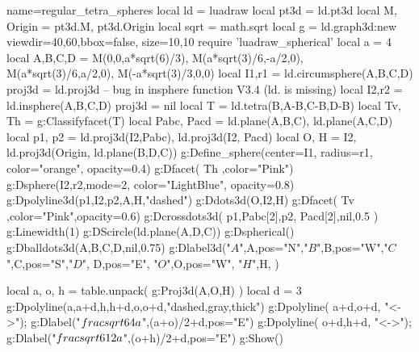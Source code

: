 \documentclass[10pt]{standalone}%
\begin{document}
\begin{luadraw}{name=regular_tetra_spheres}
local ld = luadraw
local pt3d = ld.pt3d
local M, Origin = pt3d.M, pt3d.Origin
local sqrt = math.sqrt
local g = ld.graph3d:new{ viewdir={40,60},bbox=false, size={10,10}}
require 'luadraw_spherical'
local a = 4
local A,B,C,D = M(0,0,a*sqrt(6)/3), M(a*sqrt(3)/6,-a/2,0), M(a*sqrt(3)/6,a/2,0), M(-a*sqrt(3)/3,0,0)
local I1,r1 = ld.circumsphere(A,B,C,D)
proj3d = ld.proj3d -- bug in insphere function V3.4 (ld. is missing)
local I2,r2 = ld.insphere(A,B,C,D)
proj3d = nil
local T = ld.tetra(B,A-B,C-B,D-B)
local Tv, Th = g:Classifyfacet(T)
local Pabc, Pacd = ld.plane(A,B,C), ld.plane(A,C,D)
local p1, p2 = ld.proj3d(I2,Pabc), ld.proj3d(I2, Pacd)
local O, H = I2, ld.proj3d(Origin, ld.plane(B,D,C))
g:Define_sphere({center=I1, radius=r1, color="orange", opacity=0.4})
g:Dfacet( Th ,{color="Pink"})
g:Dsphere(I2,r2,{mode=2, color="LightBlue", opacity=0.8})
g:Dpolyline3d({{p1,I2,p2},{A,H}},"dashed")
g:Ddots3d({O,I2,H})
g:Dfacet( Tv ,{color="Pink",opacity=0.6})
g:Dcrossdots3d( {{p1,Pabc[2]},{p2, Pacd[2]}},nil,0.5 )
g:Linewidth(1)
g:DScircle(ld.plane(A,D,C))
g:Dspherical()
g:Dballdots3d({A,B,C,D},nil,0.75)
g:Dlabel3d("$A$",A,{pos="N"},"$B$",B,{pos="W"},"$C$",C,{pos="S"},"$D$",
    D,{pos="E"}, "$O$",O,{pos="W"}, "$H$",H,{} )

local a, o, h = table.unpack( g:Proj3d({A,O,H}) )
local d = 3
g:Dpolyline({{a,a+d},{h,h+d},{o,o+d}},"dashed,gray,thick")
g:Dpolyline( {a+d,o+d}, "<->"); g:Dlabel("$\\frac{\\sqrt{6}}{4}a$",(a+o)/2+d,{pos="E"})
g:Dpolyline( {o+d,h+d}, "<->"); g:Dlabel("$\\frac{\\sqrt{6}}{12}a$",(o+h)/2+d,{pos="E"})
g:Show() 
\end{luadraw}
\end{document}
